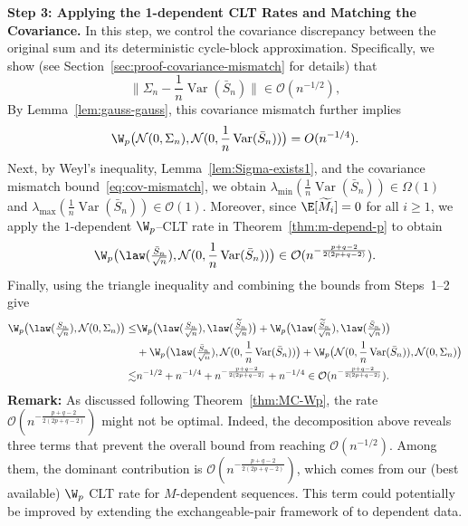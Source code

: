 \documentclass[mnsc,nonblindrev]{informs3}
\begin{document}
\medskip
\noindent\textbf{Step 3: Applying the 1-dependent CLT Rates and Matching the Covariance.}
In this step, we control the covariance discrepancy between the original sum and
its deterministic cycle-block approximation. Specifically, we show (see
Section~\ref{sec:proof-covariance-mismatch} for details) that
\begin{equation}\label{eq:cov-mismatch}
\big\|\Sigma_n-\frac{1}{n}\operatorname{Var}(\bar S_n)\big\|
\in \mathcal O(n^{-1/2}),
\end{equation}
By Lemma~\ref{lem:gauss-gauss}, this covariance mismatch further implies
\begin{equation*}
\W_p\big(\mathcal N(0,\Sigma_n),\mathcal N(0,\frac{1}{n}\operatorname{Var}(\bar S_n))\big)
=O(n^{-1/4}).
\end{equation*}
Next, by Weyl's inequality, Lemma~\ref{lem:Sigma-exists1}, and the covariance
mismatch bound~\eqref{eq:cov-mismatch}, we obtain $\lambda_{\min}(\frac{1}{n}\operatorname{Var}(\bar S_n)) \in \Omega(1)$ and $\lambda_{\max}(\frac{1}{n}\operatorname{Var}(\bar S_n)) \in \mathcal O(1).$ Moreover, since $\E[\widetilde M_i]=0$ for all $i\ge 1$, we apply the
$1$-dependent $\W_p$--CLT rate in Theorem~\ref{thm:m-depend-p} to obtain
\begin{align*}
\W_{p}\big(\law(\tfrac{\bar  S_n}{\sqrt{n}}),\mathcal N(0, \frac{1}{n}\operatorname{Var}(\bar S_n))\big) \in \mathcal{O}(n^{-\frac{p+q-2}{2(2p+q-2)}}).
\end{align*}
Finally, using the triangle inequality and combining the bounds from Steps~1--2 give
\begin{align*}
\W_{p}\big(\law(\tfrac{S_n}{\sqrt{n}}),\mathcal N(0, \Sigma_n)\big) \leq& \W_{p}\big(\law(\tfrac{S_n}{\sqrt{n}}),\law(\tfrac{\widetilde S_n}{\sqrt{n}})\big) + \W_{p}\big(\law(\tfrac{\widetilde S_n}{\sqrt{n}}),\law(\tfrac{\bar S_n}{\sqrt{n}})\big) \\
&+ \W_{p}\big(\law(\tfrac{\bar S_n}{\sqrt{n}}),\mathcal N(0, \frac{1}{n}\operatorname{Var}(\bar S_n))\big) + \W_{p}\big(\mathcal N(0, \frac{1}{n}\operatorname{Var}(\bar S_n)),\mathcal N(0, \Sigma_n)\big)\\
\lesssim& n^{-1/2} + n^{-1/4} + n^{-\frac{p+q-2}{2(2p+q-2)}} + n^{-1/4} \in \mathcal O(n^{-\frac{p+q-2}{2(2p+q-2)}}).
\end{align*}
\textbf{Remark:} As discussed following Theorem~\ref{thm:MC-Wp}, the rate
$\mathcal O(n^{-\frac{p+q-2}{2(2p+q-2)}})$ might not be
optimal. Indeed, the decomposition above reveals three terms that prevent the
overall bound from reaching $\mathcal O(n^{-1/2})$. Among them, the
dominant contribution is
$\mathcal O(n^{-\frac{p+q-2}{2(2p+q-2)}})$, which comes from our
(best available) $\W_p$ CLT rate for $M$-dependent sequences. This term could
potentially be improved by extending the exchangeable-pair framework of
\cite{bonis2020stein} to dependent data. %
\end{document}
